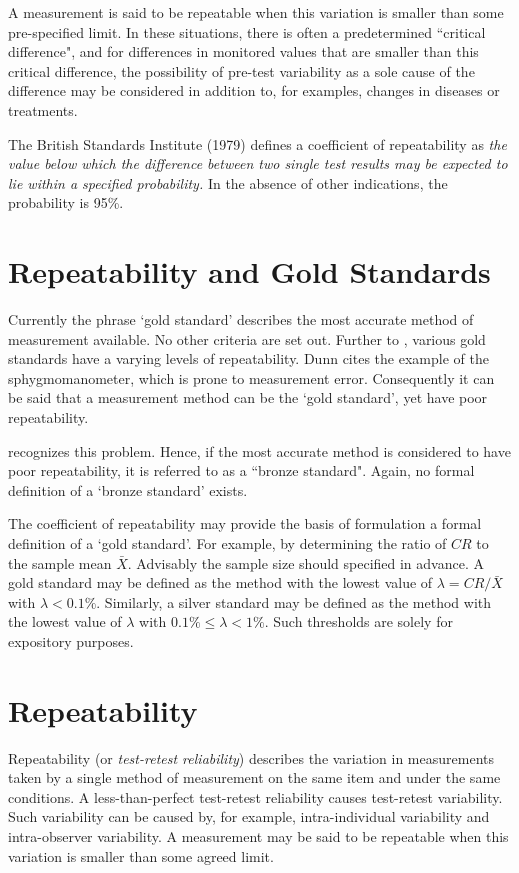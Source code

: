 \documentclass[12pt, a4paper]{report}
\theoremstyle{plain}
\theoremstyle{definition}
\theoremstyle{remark}
\begin{document}
		
		
		
		A measurement is said to be repeatable when this variation is smaller than some pre-specified limit. In these situations, there is often a predetermined ``critical difference", and for differences in monitored values that are smaller than this critical difference, the possibility of pre-test variability as a sole cause of the difference may be considered in addition to, for examples, changes in diseases or treatments. 
		
		
		The British Standards Institute (1979) defines a coefficient of repeatability  as \emph{the value below which the difference between two single test results may be expected to lie within a specified probability.} In the absence of other indications, the probability is 95\%.
		
		\section{Repeatability and Gold Standards}
		Currently the phrase `gold standard' describes the most accurate method of measurement available. No other criteria are set out. Further to \citet{dunnSEME}, various gold standards have a varying levels of repeatability. Dunn cites the example of the sphygmomanometer, which is prone to measurement error. Consequently it can be said that a measurement method can be the `gold standard', yet have poor repeatability. 
		
		\citet{dunnSEME} recognizes  this problem. Hence, if the most accurate method is considered to have poor repeatability, it is referred to as a ``bronze standard".  Again, no formal definition of a `bronze standard' exists.
		
		The coefficient of repeatability may provide the basis of formulation a formal definition of a `gold standard'. For example, by determining the ratio of $CR$ to the sample mean $\bar{X}$. Advisably the sample size should specified in advance. A gold standard may be defined as the method with the lowest value of $\lambda = CR /\bar{X}$ with $\lambda < 0.1\%$. Similarly, a silver standard may be defined as the method with the lowest value of $\lambda $ with $0.1\% \leq \lambda < 1\%$. Such thresholds are solely for expository purposes.
		
	\section{Repeatability}
	Repeatability (or \textit{test-retest reliability})  describes the variation in measurements taken by a single method of measurement on the same item and under the same conditions. 
	A less-than-perfect test-retest reliability causes test-retest variability. Such variability can be caused by, for example, intra-individual variability and intra-observer variability. 
	A measurement may be said to be repeatable when this variation is smaller than some agreed limit.
	
\end{document}
